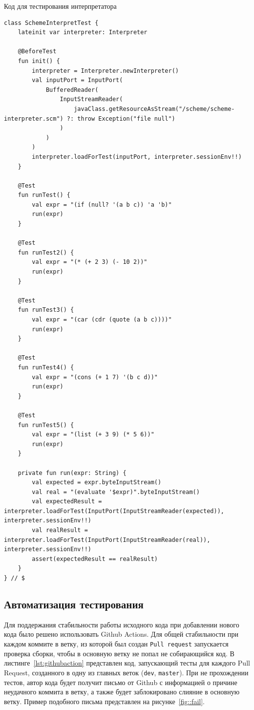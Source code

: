 \documentclass[14pt, russian]{scrartcl}
\newenvironment{longlisting}{\captionsetup{type=listing}}{}
\begin{document}
\begin{longlisting}

\caption{Код для тестирования интерпретатора}
\label{lst:testrun}
\begin{verbatim}
class SchemeInterpretTest {
    lateinit var interpreter: Interpreter

    @BeforeTest
    fun init() {
        interpreter = Interpreter.newInterpreter()
        val inputPort = InputPort(
            BufferedReader(
                InputStreamReader(
                    javaClass.getResourceAsStream("/scheme/scheme-interpreter.scm") ?: throw Exception("file null")
                )
            )
        )
        interpreter.loadForTest(inputPort, interpreter.sessionEnv!!)
    }

    @Test
    fun runTest() {
        val expr = "(if (null? '(a b c)) 'a 'b)"
        run(expr)
    }

    @Test
    fun runTest2() {
        val expr = "(* (+ 2 3) (- 10 2))"
        run(expr)
    }

    @Test
    fun runTest3() {
        val expr = "(car (cdr (quote (a b c))))"
        run(expr)
    }

    @Test
    fun runTest4() {
        val expr = "(cons (+ 1 7) '(b c d))"
        run(expr)
    }

    @Test
    fun runTest5() {
        val expr = "(list (+ 3 9) (* 5 6))"
        run(expr)
    }

    private fun run(expr: String) {
        val expected = expr.byteInputStream()
        val real = "(evaluate '$expr)".byteInputStream()
        val expectedResult = interpreter.loadForTest(InputPort(InputStreamReader(expected)), interpreter.sessionEnv!!)
        val realResult = interpreter.loadForTest(InputPort(InputStreamReader(real)), interpreter.sessionEnv!!)
        assert(expectedResult == realResult)
    }
} // $
\end{verbatim}
\end{longlisting}

\subsection{Автоматизация тестирования}

Для поддержания стабильности работы исходного кода при добавлении нового кода было решено использовать Github Actions.
Для общей стабильности при каждом коммите в ветку, из которой был создан \texttt{Pull request} запускается проверка сборки, чтобы в основную ветку не попал не собирающийся код.
В листинге~\ref{lst:githubaction} представлен код, запускающий тесты для каждого Pull Request, созданного в одну из главных веток (\texttt{dev}, \texttt{master}).
При не прохождении тестов, автор кода будет получит письмо от Github с информацией о причине неудачного коммита в ветку, а также будет заблокировано слияние в основную ветку.
Пример подобного письма представлен на рисунке~\ref{fig::fail}.
\end{document}
